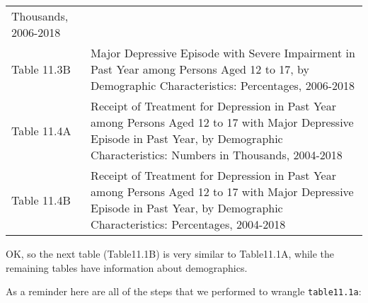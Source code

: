 \documentclass[
]{article}
\begin{document}
\begin{longtable}[]{@{}ll@{}}
\begin{minipage}[t]{0.76\columnwidth}
Thousands, 2006-2018\strut
\end{minipage}\tabularnewline
\begin{minipage}[t]{0.18\columnwidth}\raggedright
Table 11.3B\strut
\end{minipage} & \begin{minipage}[t]{0.76\columnwidth}\raggedright
Major Depressive Episode with Severe Impairment in Past Year among
Persons Aged 12 to 17, by Demographic Characteristics: Percentages,
2006-2018\strut
\end{minipage}\tabularnewline
\begin{minipage}[t]{0.18\columnwidth}\raggedright
Table 11.4A\strut
\end{minipage} & \begin{minipage}[t]{0.76\columnwidth}\raggedright
Receipt of Treatment for Depression in Past Year among Persons Aged 12
to 17 with Major Depressive Episode in Past Year, by Demographic
Characteristics: Numbers in Thousands, 2004-2018\strut
\end{minipage}\tabularnewline
\begin{minipage}[t]{0.18\columnwidth}\raggedright
Table 11.4B\strut
\end{minipage} & \begin{minipage}[t]{0.76\columnwidth}\raggedright
Receipt of Treatment for Depression in Past Year among Persons Aged 12
to 17 with Major Depressive Episode in Past Year, by Demographic
Characteristics: Percentages, 2004-2018\strut
\end{minipage}\tabularnewline
\bottomrule
\end{longtable}

OK, so the next table (Table11.1B) is very similar to Table11.1A, while
the remaining tables have information about demographics.

As a reminder here are all of the steps that we performed to wrangle
\texttt{table11.1a}:
\end{document}
